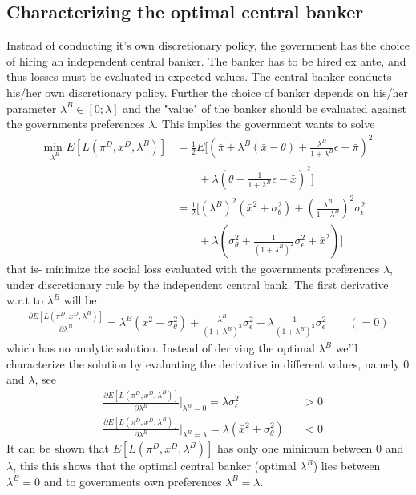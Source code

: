 \documentclass[12pt, a4paper]{article}
\begin{document}
\begin{spacing}{1.213}
\subsection{Characterizing the optimal central banker}
Instead of conducting it's own discretionary policy, the government has the choice of hiring an independent central banker. The banker has to be hired ex ante, and thus losses must be evaluated in expected values. The central banker conducts his/her own discretionary policy. Further the choice of banker depends on his/her parameter $\lambda^B \in [0;\lambda]$ and the "value" of the banker should be evaluated against the governments preferences $\lambda$. This implies the government wants to solve
\begin{align*}
\underset{\lambda^B}{\textrm{min }} E[L(\pi^D, x^D, \lambda^B)] &= \frac{1}{2}E \bigg[ \left(
\bar{\pi} + \lambda^B(\bar{x}- \theta) + \frac{\lambda^B}{1+ \lambda^B} \epsilon - \bar{\pi} \right)^2 \\
& \qquad + \lambda \left(
 \theta - \frac{1}{1+\lambda^B} \epsilon - \bar{x}
\right)^2
\bigg] \\
& = \frac{1}{2}\bigg[ (\lambda^B)^2(\bar{x}^2 + \sigma^2_{\theta}) + \left(\frac{\lambda^B}{1+ \lambda^B}\right)^2 \sigma^2_{\epsilon}  \\
& \qquad + \lambda \left(\sigma^2_{\theta} + \frac{1}{(1+\lambda^B )^2}\sigma^2_{\epsilon} + \bar{x}^2 \right) \bigg]
\end{align*}
that is- minimize the social loss evaluated with the governments preferences $\lambda$, under discretionary rule by the independent central bank. The first derivative w.r.t to $\lambda^B$ will be
\begin{align*}
\frac{\partial E[L(\pi^D, x^D, \lambda^B)]}{\partial \lambda^B} = \lambda^B(\bar{x}^2 + \sigma^2_{\theta}) + \frac{\lambda^B}{(1+\lambda^B)^3} \sigma^2_{\epsilon} - \lambda \frac{1}{(1+ \lambda^B)^3} \sigma^2_{\epsilon} \qquad (= 0)
\end{align*}
which has no analytic solution. Instead of deriving the optimal $\lambda^B$ we'll characterize the solution by evaluating the derivative in different values, namely $0$ and $\lambda$, see
\begin{align*}
&\frac{\partial E[L(\pi^D, x^D, \lambda^B)]}{\partial \lambda^B} \bigg|_{\lambda^B = 0} = \lambda \sigma^2_{\epsilon} && >0 \\
& \frac{\partial E[L(\pi^D, x^D, \lambda^B)]}{\partial \lambda^B} \bigg|_{\lambda^B = \lambda} = \lambda(\bar{x}^2 + \sigma^2_{\theta}) && <0
\end{align*}
It can be shown that $E[L(\pi^D, x^D, \lambda^B)]$ has only one minimum between $0$ and $\lambda$, this this shows that the optimal central banker (optimal $\lambda^B$) lies between $\lambda^B= 0$ and to governments own preferences $\lambda^B = \lambda$.


\end{spacing}
\end{document}
